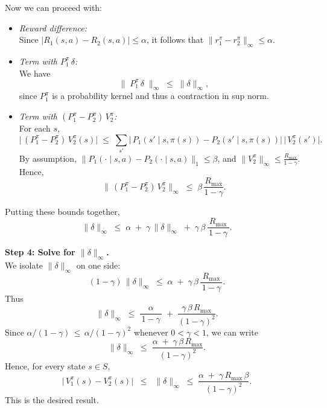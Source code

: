 Now we can proceed with:

\begin{itemize}
  \item \textit{Reward difference:}\\
    Since $\bigl|R_{1}(s,a) - R_{2}(s,a)\bigr|\le\alpha$, it follows that
    \(
       \|r_{1}^{\pi}-r_{2}^{\pi}\|_\infty \le \alpha.
    \)

  \item \textit{Term with $P_{1}^{\pi}\,\delta$:}\\
    We have
    \[
      \bigl\|\;P_{1}^{\pi}\,\delta\;\bigr\|_{\infty}
      \;\le\; \|\delta\|_{\infty},
    \]
    since $P_{1}^{\pi}$ is a probability kernel and thus a contraction in sup norm.

  \item \textit{Term with $(P_{1}^{\pi}-P_{2}^{\pi})\,V_{2}^{\pi}$:}\\
    For each $s$,
    \[
      \bigl|\,(P_{1}^{\pi}-P_{2}^{\pi})\,V_{2}^{\pi}(s)\bigr|
      \;\le\;
      \sum_{s'}\bigl|\,P_{1}(s'\mid s,\pi(s)) - P_{2}(s'\mid s,\pi(s))\bigr|\,
      \bigl|\,V_{2}^{\pi}(s')\bigr|.
    \]
    By assumption, $\|P_{1}(\cdot\mid s,a)-P_{2}(\cdot\mid s,a)\|_{1}\le\beta$, 
    and $\|V_{2}^{\pi}\|_{\infty}\le\frac{R_{\max}}{1-\gamma}$. Hence,
    \[
      \bigl\|\,(P_{1}^{\pi}-P_{2}^{\pi})\,V_{2}^{\pi}\bigr\|_{\infty}
      \;\le\;\beta\,\frac{R_{\max}}{1-\gamma}.
    \]
\end{itemize}

Putting these bounds together,
\[
  \|\delta\|_{\infty}
  \;\le\;
  \alpha
  \;+\;\gamma\,\|\delta\|_{\infty}
  \;+\;\gamma\,\beta\,\frac{R_{\max}}{\,1-\gamma\,}.
\]

\bigskip
\noindent
\textbf{Step 4: Solve for $\|\delta\|_{\infty}$.}\\
We isolate $\|\delta\|_{\infty}$ on one side:
\[
  (1-\gamma)\,\|\delta\|_{\infty}
  \;\le\;
  \alpha
  \;+\;
  \gamma\,\beta\,\frac{R_{\max}}{\,1-\gamma\,}.
\]
Thus
\[
  \|\delta\|_{\infty}
  \;\le\;
  \frac{\alpha}{\,1-\gamma\,}
  \;+\;
  \frac{\gamma\,\beta\,R_{\max}}{(1-\gamma)^2}.
\]
Since $\alpha/(1-\gamma)\,\le\,\alpha/(1-\gamma)^2$ whenever $0<\gamma<1$, we can write 
\[
  \|\delta\|_{\infty}
  \;\le\;
  \frac{\alpha\;+\;\gamma\,\beta\,R_{\max}}{(1-\gamma)^2}.
\]
Hence, for every state $s \in S$,
\[
  \bigl|\,V_{1}^{\pi}(s)-V_{2}^{\pi}(s)\bigr|
  \;\;\le\;\;
  \|\delta\|_{\infty}
  \;\le\;
  \frac{\alpha\;+\;\gamma\,R_{\max}\,\beta}{(1-\gamma)^2}.
\]
This is the desired result.